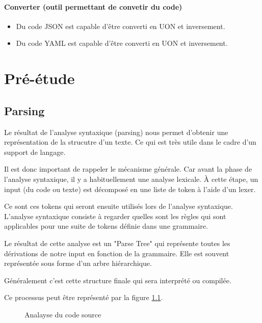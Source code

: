 \documentclass[
    iict, %
    il, %
]{heig-tb}
\begin{document}
\subsubsection*{Converter (outil permettant de convetir du code)}
\begin{itemize}
    \item Du code JSON est capable d’être converti en UON et inversement.
    \item Du code YAML est capable d’être converti en UON et inversement.
\end{itemize}

\chapter{Pré-étude}

\section{Parsing}

Le résultat de l'analyse syntaxique (parsing) nous permet d'obtenir une représentation de la strucutre d'un texte. Ce qui est très utile dans le cadre d'un support de langage.

Il est donc important de rappeler le mécanisme générale. Car avant la phase de l'analyse syntaxique, il y a habituellement une analyse lexicale.
À cette étape, un input (du code ou texte) est décomposé en une liste de token à l'aide d'un lexer.

Ce sont ces tokens qui seront ensuite utilisés lors de l'analyse syntaxique.
L'analyse syntaxique consiste à regarder quelles sont les règles qui sont applicables pour une suite de tokens définie dans une grammaire.

Le résultat de cette analyse est un "Parse Tree" qui représente toutes les dérivations de notre input en fonction de la grammaire.
Elle est souvent représentée sous forme d'un arbre hiérarchique.

Généralement c'est cette structure finale qui sera interprété ou compilée.

Ce processus peut être représenté par la figure \ref{Analayse du code source}.

\begin{figure}[!h]
    \begin{center}
    \end{center}
    \caption[Analayse du code source]{\label{Analayse du code source} Analayse du code source}
\end{figure}
\end{document}
